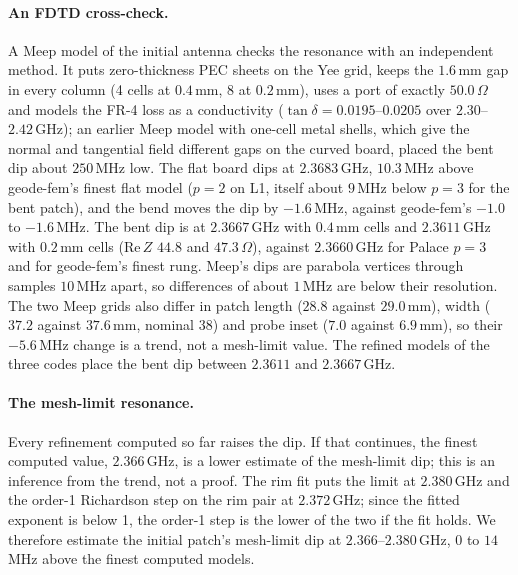\documentclass{anvil-paper}
\begin{document}
\paragraph{An FDTD cross-check.}
A Meep \citep{oskooi2010meep} model of the initial antenna checks the
resonance with an independent method. It puts zero-thickness PEC sheets on
the Yee grid, keeps the $1.6$\,mm gap in every column (4 cells at $0.4$\,mm, 8
at $0.2$\,mm), uses a port of exactly $50.0\,\Omega$ and models the FR-4 loss
as a conductivity ($\tan\delta = 0.0195$--$0.0205$ over $2.30$--$2.42$\,GHz);
an earlier Meep model with one-cell metal shells, which give the normal and
tangential field different gaps on the curved board, placed the bent dip
about $250$\,MHz low. The flat board dips at $2.3683$\,GHz, $10.3$\,MHz above
geode-fem's finest flat model ($p = 2$ on L1, itself about $9$\,MHz below
$p = 3$ for the bent patch), and the bend moves the dip by $-1.6$\,MHz,
against geode-fem's $-1.0$ to $-1.6$\,MHz. The bent dip is at $2.3667$\,GHz
with $0.4$\,mm cells and $2.3611$\,GHz with $0.2$\,mm cells
($\mathrm{Re}\,Z$ $44.8$ and $47.3\,\Omega$), against $2.3660$\,GHz for Palace
$p = 3$ and for geode-fem's finest rung. Meep's dips are parabola vertices
through samples $10$\,MHz apart, so differences of about $1$\,MHz are below
their resolution. The two Meep grids also differ in patch length ($28.8$
against $29.0$\,mm), width ($37.2$ against $37.6$\,mm, nominal $38$) and probe
inset ($7.0$ against $6.9$\,mm), so their $-5.6$\,MHz change is a trend, not a
mesh-limit value. The refined models of the three codes place the bent dip
between $2.3611$ and $2.3667$\,GHz.

\paragraph{The mesh-limit resonance.}
Every refinement computed so far raises the dip. If that continues, the
finest computed value, $2.366$\,GHz, is a lower estimate of the mesh-limit
dip; this is an inference from the trend, not a proof. The rim fit puts the limit at $2.380$\,GHz and the order-1
Richardson step on the rim pair at $2.372$\,GHz; since the fitted exponent
is below 1, the order-1 step is the lower of the two if the fit holds. We
therefore estimate the initial patch's mesh-limit dip at
$2.366$--$2.380$\,GHz, $0$ to $14$\,MHz above the finest computed models.
\end{document}
